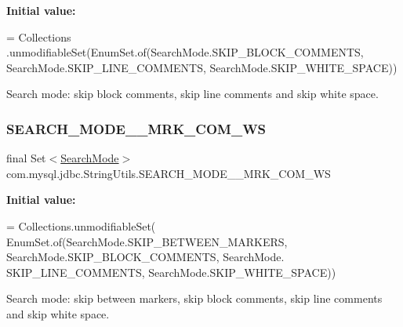 {\bfseries Initial value\+:}
\begin{DoxyCode}
= Collections
            .unmodifiableSet(EnumSet.of(SearchMode.SKIP\_BLOCK\_COMMENTS, SearchMode.SKIP\_LINE\_COMMENTS, 
      SearchMode.SKIP\_WHITE\_SPACE))
\end{DoxyCode}
Search mode\+: skip block comments, skip line comments and skip white space. \mbox{\label{classcom_1_1mysql_1_1jdbc_1_1_string_utils_a866b8f1784ccb509241bd1e090006dfb}} 
\subsubsection{\texorpdfstring{S\+E\+A\+R\+C\+H\+\_\+\+M\+O\+D\+E\+\_\+\+\_\+\+M\+R\+K\+\_\+\+C\+O\+M\+\_\+\+WS}{SEARCH\_MODE\_\_MRK\_COM\_WS}}
{\footnotesize\ttfamily final Set$<$\mbox{\hyperlink{enumcom_1_1mysql_1_1jdbc_1_1_string_utils_1_1_search_mode}{Search\+Mode}}$>$ com.\+mysql.\+jdbc.\+String\+Utils.\+S\+E\+A\+R\+C\+H\+\_\+\+M\+O\+D\+E\+\_\+\+\_\+\+M\+R\+K\+\_\+\+C\+O\+M\+\_\+\+WS\hspace{0.3cm}{\ttfamily [static]}}

{\bfseries Initial value\+:}
\begin{DoxyCode}
= Collections.unmodifiableSet(
            EnumSet.of(SearchMode.SKIP\_BETWEEN\_MARKERS, SearchMode.SKIP\_BLOCK\_COMMENTS, SearchMode.
      SKIP\_LINE\_COMMENTS, SearchMode.SKIP\_WHITE\_SPACE))
\end{DoxyCode}
Search mode\+: skip between markers, skip block comments, skip line comments and skip white space. \mbox{\label{classcom_1_1mysql_1_1jdbc_1_1_string_utils_af6d3d63373df472a5518bd7dcc2ebcb7}} 
